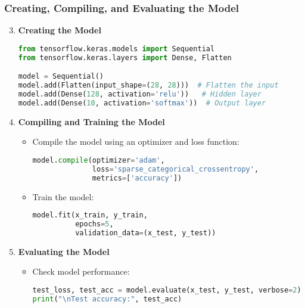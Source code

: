 \documentclass{beamer}
\begin{document}
\begin{frame}[fragile]
    \frametitle{Creating, Compiling, and Evaluating the Model}
    \begin{enumerate}
        \setcounter{enumi}{2}
        \item \textbf{Creating the Model}
            \begin{lstlisting}[language=python]
from tensorflow.keras.models import Sequential
from tensorflow.keras.layers import Dense, Flatten

model = Sequential()
model.add(Flatten(input_shape=(28, 28)))  # Flatten the input
model.add(Dense(128, activation='relu'))   # Hidden layer
model.add(Dense(10, activation='softmax'))  # Output layer
            \end{lstlisting}
        
        \item \textbf{Compiling and Training the Model}
            \begin{itemize}
                \item Compile the model using an optimizer and loss function:
                \begin{lstlisting}[language=python]
model.compile(optimizer='adam', 
              loss='sparse_categorical_crossentropy', 
              metrics=['accuracy'])
                \end{lstlisting}
                \item Train the model:
                \begin{lstlisting}[language=python]
model.fit(x_train, y_train, 
          epochs=5, 
          validation_data=(x_test, y_test))
                \end{lstlisting}
            \end{itemize}
        
        \item \textbf{Evaluating the Model}
            \begin{itemize}
                \item Check model performance:
                \begin{lstlisting}[language=python]
test_loss, test_acc = model.evaluate(x_test, y_test, verbose=2)
print("\nTest accuracy:", test_acc)
                \end{lstlisting}
            \end{itemize}
    \end{enumerate}
\end{frame}
\end{document}
